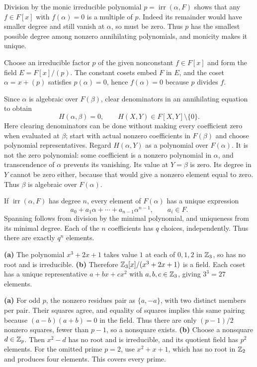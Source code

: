 Division by the monic irreducible polynomial $p=\operatorname{irr}(\alpha,F)$ shows that any $f\in F[x]$ with $f(\alpha)=0$ is a multiple of $p$. Indeed its remainder would have smaller degree and still vanish at $\alpha$, so must be zero. Thus $p$ has the smallest possible degree among nonzero annihilating polynomials, and monicity makes it unique.

Choose an irreducible factor $p$ of the given nonconstant $f\in F[x]$ and form the field $E=F[x]/(p)$. The constant cosets embed $F$ in $E$, and the coset $\alpha=x+(p)$ satisfies $p(\alpha)=0$, hence $f(\alpha)=0$ because $p$ divides $f$.

Since $\alpha$ is algebraic over $F(\beta)$, clear denominators in an annihilating equation to obtain
\[H(\alpha,\beta)=0,\qquad H(X,Y)\in F[X,Y]\setminus\{0\}.\]
Here clearing denominators can be done without making every coefficient zero when evaluated at $\beta$; start with actual nonzero coefficients in $F(\beta)$ and choose polynomial representatives.
Regard $H(\alpha,Y)$ as a polynomial over $F(\alpha)$. It is not the zero polynomial: some coefficient is a nonzero polynomial in $\alpha$, and transcendence of $\alpha$ prevents its vanishing. Its value at $Y=\beta$ is zero. Its degree in $Y$ cannot be zero either, because that would give a nonzero element equal to zero. Thus $\beta$ is algebraic over $F(\alpha)$.

If $\operatorname{irr}(\alpha,F)$ has degree $n$, every element of $F(\alpha)$ has a unique expression
\[a_0+a_1\alpha+\cdots+a_{n-1}\alpha^{n-1},\qquad a_i\in F.\]
Spanning follows from division by the minimal polynomial, and uniqueness from its minimal degree. Each of the $n$ coefficients has $q$ choices, independently. Thus there are exactly $q^n$ elements.

\textbf{(a)} The polynomial $x^3+2x+1$ takes value $1$ at each of $0,1,2$ in $\mathbb{Z}_3$, so has no root and is irreducible.
\textbf{(b)} Therefore $\mathbb{Z}_3[x]/(x^3+2x+1)$ is a field. Each coset has a unique representative $a+bx+cx^2$ with $a,b,c\in\mathbb{Z}_3$, giving $3^3=27$ elements.

\textbf{(a)} For odd $p$, the nonzero residues pair as $\{a,-a\}$, with two distinct members per pair. Their squares agree, and equality of squares implies this same pairing because $(a-b)(a+b)=0$ in the field. Thus there are only $(p-1)/2$ nonzero squares, fewer than $p-1$, so a nonsquare exists.
\textbf{(b)} Choose a nonsquare $d\in\mathbb{Z}_p$. Then $x^2-d$ has no root and is irreducible, and its quotient field has $p^2$ elements. For the omitted prime $p=2$, use $x^2+x+1$, which has no root in $\mathbb{Z}_2$ and produces four elements. This covers every prime.

